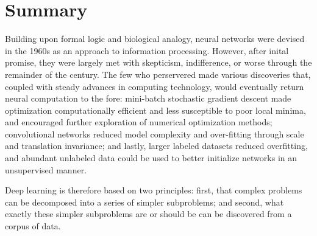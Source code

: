 \section{Summary}
\label{sec:summary}

Building upon formal logic and biological analogy, neural networks were devised in the 1960s as an approach to information processing.
However, after inital promise, they were largely met with skepticism, indifference, or worse through the remainder of the century.
The few who perservered made various discoveries that, coupled with steady advances in computing technology, would eventually return neural computation to the fore:
mini-batch stochastic gradient descent made optimization computationally efficient and less susceptible to poor local minima, and encouraged further exploration of numerical optimization methods;
convolutional networks reduced model complexity and over-fitting through scale and translation invariance;
and lastly, larger labeled datasets reduced overfitting, and abundant unlabeled data could be used to better initialize networks in an unsupervised manner.

Deep learning is therefore based on two principles: first, that complex problems can be decomposed into a series of simpler subproblems; and second, what exactly these simpler subproblems are or should be can be discovered from a corpus of data.

